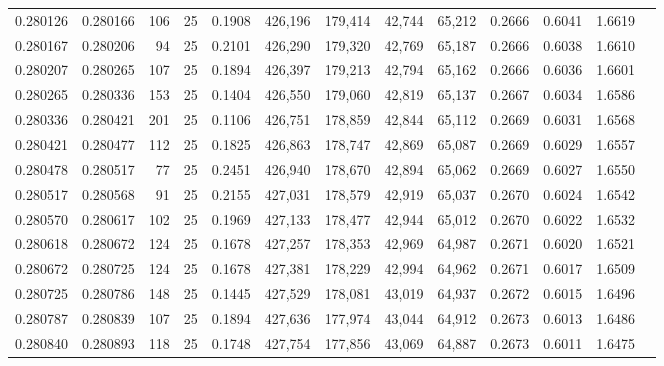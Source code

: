 \begin{tabular}{rrrrrrrrrrrrr}
0.280126 & 0.280166 &   106 &  25 &                                     0.1908 & 426,196 & 179,414 &  42,744 &  65,212 & 0.2666 & 0.6041 & 1.6619 \\
0.280167 & 0.280206 &    94 &  25 &                                     0.2101 & 426,290 & 179,320 &  42,769 &  65,187 & 0.2666 & 0.6038 & 1.6610 \\
0.280207 & 0.280265 &   107 &  25 &                                     0.1894 & 426,397 & 179,213 &  42,794 &  65,162 & 0.2666 & 0.6036 & 1.6601 \\
0.280265 & 0.280336 &   153 &  25 &                                     0.1404 & 426,550 & 179,060 &  42,819 &  65,137 & 0.2667 & 0.6034 & 1.6586 \\
0.280336 & 0.280421 &   201 &  25 &                                     0.1106 & 426,751 & 178,859 &  42,844 &  65,112 & 0.2669 & 0.6031 & 1.6568 \\
0.280421 & 0.280477 &   112 &  25 &                                     0.1825 & 426,863 & 178,747 &  42,869 &  65,087 & 0.2669 & 0.6029 & 1.6557 \\
0.280478 & 0.280517 &    77 &  25 &                                     0.2451 & 426,940 & 178,670 &  42,894 &  65,062 & 0.2669 & 0.6027 & 1.6550 \\
0.280517 & 0.280568 &    91 &  25 &                                     0.2155 & 427,031 & 178,579 &  42,919 &  65,037 & 0.2670 & 0.6024 & 1.6542 \\
0.280570 & 0.280617 &   102 &  25 &                                     0.1969 & 427,133 & 178,477 &  42,944 &  65,012 & 0.2670 & 0.6022 & 1.6532 \\
0.280618 & 0.280672 &   124 &  25 &                                     0.1678 & 427,257 & 178,353 &  42,969 &  64,987 & 0.2671 & 0.6020 & 1.6521 \\
0.280672 & 0.280725 &   124 &  25 &                                     0.1678 & 427,381 & 178,229 &  42,994 &  64,962 & 0.2671 & 0.6017 & 1.6509 \\
0.280725 & 0.280786 &   148 &  25 &                                     0.1445 & 427,529 & 178,081 &  43,019 &  64,937 & 0.2672 & 0.6015 & 1.6496 \\
0.280787 & 0.280839 &   107 &  25 &                                     0.1894 & 427,636 & 177,974 &  43,044 &  64,912 & 0.2673 & 0.6013 & 1.6486 \\
0.280840 & 0.280893 &   118 &  25 &                                     0.1748 & 427,754 & 177,856 &  43,069 &  64,887 & 0.2673 & 0.6011 & 1.6475 \\

\end{tabular}
